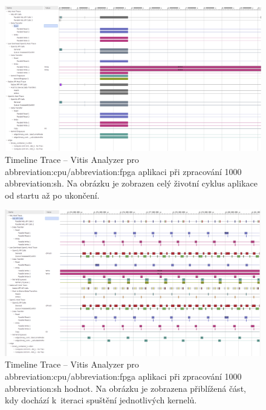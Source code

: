 \documentclass[a4paper, twoside, 11pt]{article}
\begin{document}
	\begin{figure}[htbp!]
		\centering
		\includegraphics[width=1\textwidth]{src/png/vitis-analyzer/rt/cpu-fpga-model-1k-values-0.000001-step/writing-data-output/rt-timeline-trace-zoom-out.png}
		\caption{Timeline Trace – Vitis Analyzer pro \gls{abbreviation:cpu}/\gls{abbreviation:fpga} aplikaci při zpracování 1000 \gls{abbreviation:sh}. Na obrázku je zobrazen celý životní cyklus aplikace od startu až po ukončení.}
		\label{fig:rt-timeline-trace-zoom-out}
	\end{figure}

	\begin{figure}[htbp!]
		\centering
		\includegraphics[width=1\textwidth]{src/png/vitis-analyzer/rt/cpu-fpga-model-1k-values-0.000001-step/writing-data-output/rt-timeline-trace-execution-start-zoom-in.png}
		\caption{Timeline Trace – Vitis Analyzer pro \gls{abbreviation:cpu}/\gls{abbreviation:fpga} aplikaci při zpracování 1000 \gls{abbreviation:sh} hodnot. Na obrázku je zobrazena přiblížená část, kdy dochází k~iteraci spuštění jednotlivých kernelů.}
		\label{fig:rt-timeline-trace-execution-start-zoom-in}
	\end{figure}
\end{document}
